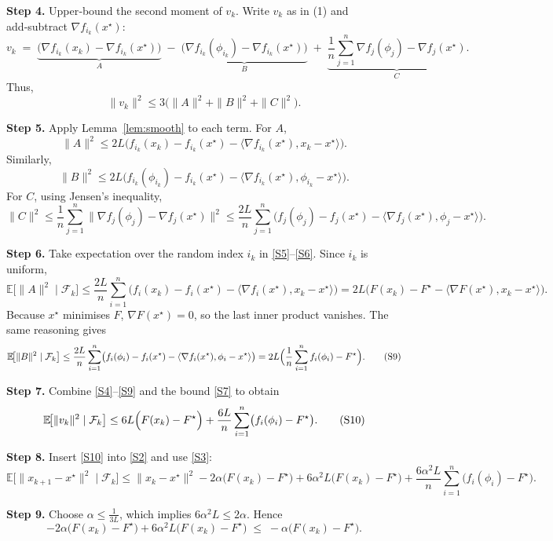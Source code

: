 \documentclass{article}
\newcommand{\E}{\mathbb{E}}
\begin{document}
\noindent\textbf{Step 4.} Upper‑bound the second moment of $v_k$. Write $v_k$ as in (1) and add‑subtract $\nabla f_{i_k}(x^\star)$:
\[
v_k \;=\; \underbrace{\bigl(\nabla f_{i_k}(x_k)-\nabla f_{i_k}(x^\star)\bigr)}_{A}
       \;-\;\underbrace{\bigl(\nabla f_{i_k}(\phi_{i_k})-\nabla f_{i_k}(x^\star)\bigr)}_{B}
       \;+\;\underbrace{\frac1n\sum_{j=1}^n\nabla f_j(\phi_j)-\nabla f_j(x^\star)}_{C}.
\]
Thus,
\[
\|v_k\|^2\le 3\bigl(\|A\|^2+\|B\|^2+\|C\|^2\bigr) .
\tag{S4}
\]

\noindent\textbf{Step 5.} Apply Lemma~\ref{lem:smooth} to each term. For $A$,
\[
\|A\|^2\le 2L\bigl(f_{i_k}(x_k)-f_{i_k}(x^\star)-\langle\nabla f_{i_k}(x^\star),x_k-x^\star\rangle\bigr).
\tag{S5}
\]
Similarly,
\[
\|B\|^2\le 2L\bigl(f_{i_k}(\phi_{i_k})-f_{i_k}(x^\star)-\langle\nabla f_{i_k}(x^\star),\phi_{i_k}-x^\star\rangle\bigr).
\tag{S6}
\]
For $C$, using Jensen’s inequality,
\[
\|C\|^2
    \le \frac{1}{n}\sum_{j=1}^n\|\nabla f_j(\phi_j)-\nabla f_j(x^\star)\|^2
    \le \frac{2L}{n}\sum_{j=1}^n\bigl(f_j(\phi_j)-f_j(x^\star)-\langle\nabla f_j(x^\star),\phi_j-x^\star\rangle\bigr).
\tag{S7}
\]

\noindent\textbf{Step 6.} Take expectation over the random index $i_k$ in \eqref{S5}–\eqref{S6}. Since $i_k$ is uniform,
\[
\E\!\big[\|A\|^2\mid\mathcal{F}_k\big]\le 
\frac{2L}{n}\sum_{i=1}^n\bigl(f_i(x_k)-f_i(x^\star)-\langle\nabla f_i(x^\star),x_k-x^\star\rangle\bigr)
 =2L\bigl(F(x_k)-F^\star-\langle\nabla F(x^\star),x_k-x^\star\rangle\bigr).
\tag{S8}
\]
Because $x^\star$ minimises $F$, $\nabla F(x^\star)=0$, so the last inner product vanishes. The same reasoning gives
\[
\E\!\big[\|B\|^2\mid\mathcal{F}_k\big]\le
\frac{2L}{n}\sum_{i=1}^n\bigl(f_i(\phi_i)-f_i(x^\star)-\langle\nabla f_i(x^\star),\phi_i-x^\star\rangle\bigr)
=2L\Bigl(\frac1n\sum_{i=1}^n f_i(\phi_i)-F^\star\Bigr).
\tag{S9}
\]

\noindent\textbf{Step 7.} Combine \eqref{S4}–\eqref{S9} and the bound \eqref{S7} to obtain
\[
\E\!\big[\|v_k\|^2\mid\mathcal{F}_k\big]
\le 6L\Bigl(F(x_k)-F^\star\Bigr)
     +\frac{6L}{n}\sum_{i=1}^n\bigl(f_i(\phi_i)-F^\star\bigr).
\tag{S10}
\]

\noindent\textbf{Step 8.} Insert \eqref{S10} into \eqref{S2} and use \eqref{S3}:
\[
\E\!\big[\|x_{k+1}-x^\star\|^2\mid\mathcal{F}_k\big]
\le\|x_k-x^\star\|^2-2\alpha\bigl(F(x_k)-F^\star\bigr)
   +6\alpha^{2}L\bigl(F(x_k)-F^\star\bigr)
   +\frac{6\alpha^{2}L}{n}\sum_{i=1}^n\bigl(f_i(\phi_i)-F^\star\bigr).
\tag{S11}
\]

\noindent\textbf{Step 9.} Choose $\alpha\le \frac{1}{3L}$, which implies $6\alpha^{2}L\le 2\alpha$. Hence
\[
-2\alpha\bigl(F(x_k)-F^\star\bigr)+6\alpha^{2}L\bigl(F(x_k)-F^\star\bigr)
\;\le\; -\alpha\bigl(F(x_k)-F^\star\bigr).
\tag{S12}
\]
\end{document}
